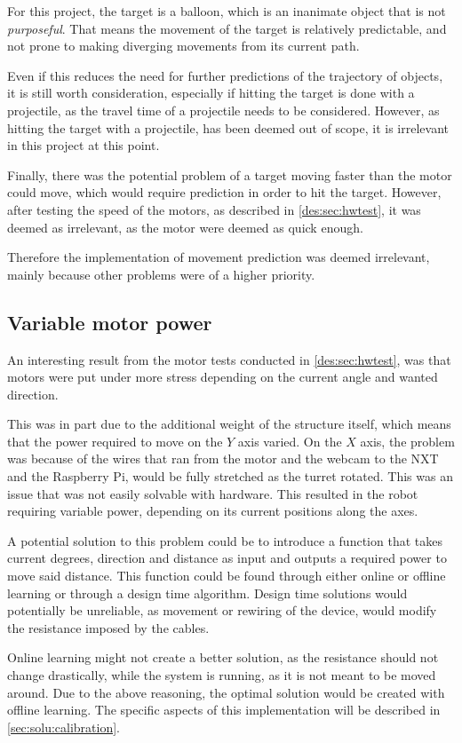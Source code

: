For this project, the target is a balloon, which is an inanimate object that is not \textit{purposeful}.
That means the movement of the target is relatively predictable, and not prone to making diverging movements from its current path.

Even if this reduces the need for further predictions of the trajectory of objects, it is still worth consideration, especially if hitting the target is done with a projectile, as the travel time of a projectile needs to be considered.
However, as hitting the target with a projectile, has been deemed out of scope, it is irrelevant in this project at this point.

Finally, there was the potential problem of a target moving faster than the motor could move, which would require prediction in order to hit the target.
However, after testing the speed of the motors, as described in \autoref{des:sec:hwtest}, it was deemed as irrelevant, as the motor were deemed as quick enough.

Therefore the implementation of movement prediction was deemed irrelevant, mainly because other problems were of a higher priority.

\subsection{Variable motor power}\label{subsec:variable_motor_power}
An interesting result from the motor tests conducted in \autoref{des:sec:hwtest}, was that motors were put under more stress depending on the current angle and wanted direction.

This was in part due to the additional weight of the structure itself, which means that the power required to move on the $Y$ axis varied.
On the $X$ axis, the problem was because of the wires that ran from the motor and the webcam to the NXT and the Raspberry Pi, would be fully stretched as the turret rotated.
This was an issue that was not easily solvable with hardware.
This resulted in the robot requiring variable power, depending on its current positions along the axes.

A potential solution to this problem could be to introduce a function that takes current degrees, direction and distance as input and outputs a required power to move said distance.
This function could be found through either online or offline learning or through a design time algorithm.
Design time solutions would potentially be unreliable, as movement or rewiring of the device, would modify the resistance imposed by the cables.

Online learning might not create a better solution, as the resistance should not change drastically, while the system is running, as it is not meant to be moved around.
Due to the above reasoning, the optimal solution would be created with offline learning.
The specific aspects of this implementation will be described in \autoref{sec:solu:calibration}.
